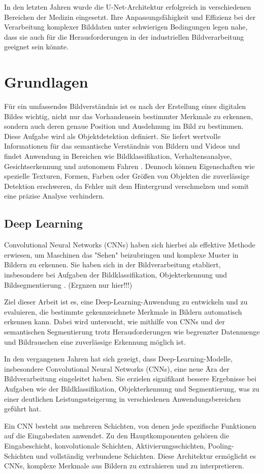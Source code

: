 In den letzten Jahren wurde die U-Net-Architektur erfolgreich in verschiedenen Bereichen der Medizin eingesetzt\cite{azad_medical_2024,siddique_u-net_2021}. Ihre Anpassungsfähigkeit und Effizienz bei der Verarbeitung komplexer Bilddaten unter schwierigen Bedingungen legen nahe, dass sie auch für die Herausforderungen in der industriellen Bildverarbeitung geeignet sein könnte.


\section{Grundlagen}

Für ein umfassendes Bildverständnis ist es nach der Erstellung eines digitalen Bildes wichtig, nicht nur das Vorhandensein bestimmter Merkmale zu erkennen, sondern auch deren genaue Position und Ausdehnung im Bild zu bestimmen. Diese Aufgabe wird als Objektdetektion definiert. Sie liefert wertvolle Informationen für das semantische Verständnis von Bildern und Videos und findet Anwendung in Bereichen wie Bildklassifikation, Verhaltensanalyse, Gesichtserkennung und autonomem Fahren \cite{zhao_object_2019}. Dennoch können Eigenschaften wie spezielle Texturen, Formen, Farben oder Größen von Objekten die zuverlässige Detektion erschweren, da Fehler mit dem Hintergrund verschmelzen und somit eine präzise Analyse verhindern.

\subsection{Deep Learning}
Convolutional Neural Networks (CNNs) haben sich hierbei als effektive Methode erwiesen, um Maschinen das "Sehen" beizubringen und komplexe Muster in Bildern zu erkennen. Sie haben sich in der Bildverarbeitung etabliert, insbesondere bei Aufgaben der Bildklassifikation, Objekterkennung und Bildsegmentierung \cite{qi_review_2020}. (Ergnzen nur hier!!!)

Ziel dieser Arbeit ist es, eine Deep-Learning-Anwendung zu entwickeln und zu evaluieren, die bestimmte gekennzeichnete Merkmale in Bildern automatisch erkennen kann. Dabei wird untersucht, wie mithilfe von CNNs und der semantischen Segmentierung trotz Herausforderungen wie begrenzter Datenmenge und Bildrauschen eine zuverlässige Erkennung möglich ist.

 In den vergangenen Jahren hat sich gezeigt, dass Deep-Learning-Modelle, insbesondere Convolutional Neural Networks (CNNs), eine neue Ära der Bildverarbeitung eingeleitet haben. Sie erzielen signifikant bessere Ergebnisse bei Aufgaben wie der Bildklassifikation, Objekterkennung und Segmentierung, was zu einer deutlichen Leistungssteigerung in verschiedenen Anwendungsbereichen geführt hat.\cite{minaee_image_2022}

Ein CNN besteht aus mehreren Schichten, von denen jede spezifische Funktionen auf die Eingabedaten anwendet. Zu den Hauptkomponenten gehören die Eingabeschicht, konvolutionale Schichten, Aktivierungsschichten, Pooling-Schichten und vollständig verbundene Schichten. Diese Architektur ermöglicht es CNNs, komplexe Merkmale aus Bildern zu extrahieren und zu interpretieren.\cite{jogin_feature_2018}